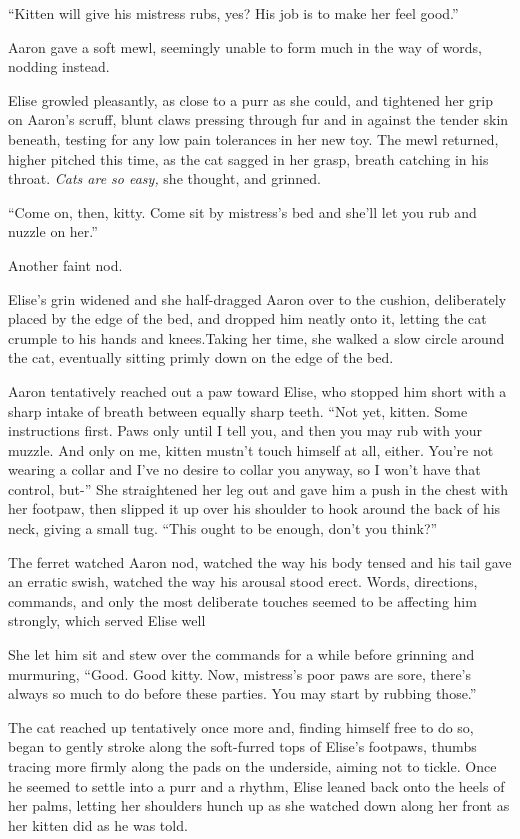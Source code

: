 \documentclass[12pt,letterpaper,oneside]{memoir}
\begin{document}
  ``Kitten will give his mistress rubs, yes? His job is to make her feel good.''

  Aaron gave a soft mewl, seemingly unable to form much in the way of words, nodding instead.

  Elise growled pleasantly, as close to a purr as she could, and tightened her grip on Aaron's scruff, blunt claws pressing through fur and in against the tender skin beneath, testing for any low pain tolerances in her new toy. The mewl returned, higher pitched this time, as the cat sagged in her grasp, breath catching in his throat. \textit{Cats are so easy,} she thought, and grinned.

  ``Come on, then, kitty. Come sit by mistress's bed and she'll let you rub and nuzzle on her.''

  Another faint nod.

  Elise's grin widened and she half-dragged Aaron over to the cushion, deliberately placed by the edge of the bed, and dropped him neatly onto it, letting the cat crumple to his hands and knees.Taking her time, she walked a slow circle around the cat, eventually sitting primly down on the edge of the bed.

  Aaron tentatively reached out a paw toward Elise, who stopped him short with a sharp intake of breath between equally sharp teeth. ``Not yet, kitten. Some instructions first. Paws only until I tell you, and then you may rub with your muzzle. And only on me, kitten mustn't touch himself at all, either. You're not wearing a collar and I've no desire to collar you anyway, so I won't have that control, but-'' She straightened her leg out and gave him a push in the chest with her footpaw, then slipped it up over his shoulder to hook around the back of his neck, giving a small tug. ``This ought to be enough, don't you think?''

  The ferret watched Aaron nod, watched the way his body tensed and his tail gave an erratic swish, watched the way his arousal stood erect. Words, directions, commands, and only the most deliberate touches seemed to be affecting him strongly, which served Elise well

  She let him sit and stew over the commands for a while before grinning and murmuring, ``Good. Good kitty. Now, mistress's poor paws are sore, there's always so much to do before these parties. You may start by rubbing those.''

  The cat reached up tentatively once more and, finding himself free to do so, began to gently stroke along the soft-furred tops of Elise's footpaws, thumbs tracing more firmly along the pads on the underside, aiming not to tickle. Once he seemed to settle into a purr and a rhythm, Elise leaned back onto the heels of her palms, letting her shoulders hunch up as she watched down along her front as her kitten did as he was told.
\end{document}
